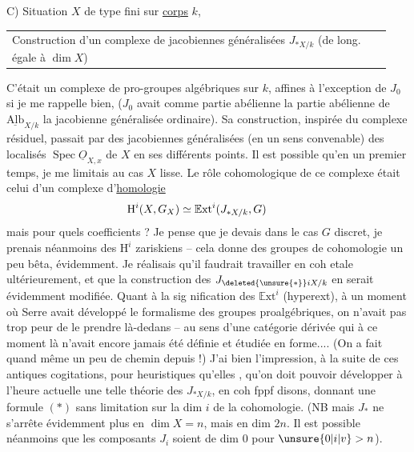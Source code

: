 C) Situation $X$ de type fini sur \uline{corps} $k$,

\noindent\begin{tabular}{@{}|p{0.94\linewidth}@{}}
Construction d'un complexe de jacobiennes généralisées $J_{*X/k}$ (de long. égale à $\dim X$)
\end{tabular}
C'était un complexe de pro-groupes algébriques sur $k$, affines à l'exception de $J_0$ si je me rappelle bien, ($J_0$ avait comme partie abélienne la partie abélienne de $\underline{\mathrm{Alb}}_{X/k}$
la jacobienne généralisée ordinaire). Sa construction, inspirée du complexe résiduel, passait par des jacobiennes généralisées (en un sens  convenable) des localisés $\operatorname{Spec}\underline{O}_{X,x}$ de $X$ en ses différents points. Il est possible qu'en un premier temps, je me limitais au cas $X$ lisse. Le rôle cohomologique de ce complexe était celui d'un complexe d'\uline{homologie}
\[
\mathrm{H}^{i}(X,G_X)\simeq\mathbb{E}\mathrm{xt}^{i}(J_{*X/k},G)\tag*{\makebox[0pt][r]{\makebox[\linewidth][l]{\unsure{\ensuremath{\alpha})|a)|(*)}}}}
\]
mais pour quels coefficients ? Je pense que je devais     dans le cas $G$ discret, je prenais néanmoins des $\mathrm{H}^{i}$ zariskiens -- cela donne des groupes de cohomologie un peu bêta, évidemment. Je réalisais qu'il faudrait travailler en coh etale ultérieurement, et que la construction des $J_{\deleted{\unsure{*}}iX/k}$ en serait évidemment modifiée. Quant à la sig%
%
nification des $\mathbb{E}\mathrm{xt}^{i}$ (hyperext), à un moment où Serre avait développé le formalisme des groupes proalgébriques, on n'avait pas trop peur de le prendre là-dedans -- au sens d'une catégorie dérivée qui à ce moment là n'avait encore jamais été définie et étudiée en forme.... (On a fait quand même un peu de chemin depuis !) J'ai bien l'impression, à la suite de ces antiques cogitations, pour heuristiques qu'elles , qu'on doit pouvoir développer à l'heure actuelle une telle théorie des $J_{*X/k}$, en coh fppf disons, donnant une formule $(*)$ sans limitation sur la dim $i$ de la cohomologie. (NB mais $J_*$ ne s'arrête évidemment plus en $\dim X=n$, mais en dim $2n$. Il est possible néanmoins que les composants $J_i$ soient de dim $0$ pour $\unsure{0|i|v}>n$).

